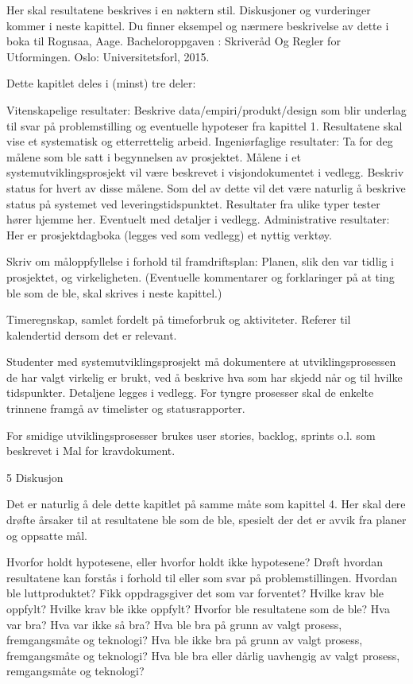 Her skal resultatene beskrives i en nøktern stil. Diskusjoner og vurderinger kommer i neste kapittel. Du finner eksempel og nærmere beskrivelse av dette i boka til Rognsaa, Aage. Bacheloroppgaven : Skriveråd Og Regler for Utformingen. Oslo: Universitetsforl, 2015.

Dette kapitlet deles i (minst) tre deler:

Vitenskapelige resultater: Beskrive data/empiri/produkt/design som blir underlag til svar på problemstilling og eventuelle hypoteser fra kapittel 1. Resultatene skal vise et systematisk og etterrettelig arbeid. 
Ingeniørfaglige resultater: Ta for deg målene som ble satt i begynnelsen av prosjektet. Målene i et systemutviklingsprosjekt vil være beskrevet i visjondokumentet i vedlegg. Beskriv status for hvert av disse målene. Som del av dette vil det være naturlig å beskrive status på systemet ved leveringstidspunktet.
Resultater fra ulike typer tester hører hjemme her. Eventuelt med detaljer i vedlegg.
Administrative resultater: Her er prosjektdagboka (legges ved som vedlegg) et nyttig verktøy.

Skriv om måloppfyllelse i forhold til framdriftsplan: Planen, slik den var tidlig i prosjektet, og virkeligheten. (Eventuelle kommentarer og forklaringer på at ting ble som de ble, skal skrives i neste kapittel.)

Timeregnskap, samlet fordelt på timeforbruk og aktiviteter. Referer til kalendertid dersom det er relevant.

Studenter med systemutviklingsprosjekt må dokumentere at utviklingsprosessen de har valgt virkelig er brukt, ved å beskrive hva som har skjedd når og til hvilke tidspunkter. Detaljene legges i vedlegg. For tyngre prosesser skal de enkelte trinnene framgå av timelister og statusrapporter.

For smidige utviklingsprosesser brukes user stories, backlog, sprints o.l. som beskrevet i Mal for kravdokument.

5 Diskusjon

Det er naturlig å dele dette kapitlet på samme måte som kapittel 4. Her skal dere drøfte årsaker til at resultatene ble som de ble, spesielt der det er avvik fra planer og oppsatte mål.

Hvorfor holdt hypotesene, eller hvorfor holdt ikke hypotesene? Drøft hvordan resultatene kan forstås i forhold til eller som svar på problemstillingen. Hvordan ble luttproduktet? Fikk oppdragsgiver det som var forventet? Hvilke krav ble oppfylt? Hvilke krav ble ikke oppfylt? Hvorfor ble resultatene som de ble? Hva var bra? Hva var ikke så bra? Hva ble bra på grunn av valgt prosess, fremgangsmåte og teknologi? Hva ble ikke bra på grunn av valgt prosess, fremgangsmåte og teknologi? Hva ble bra eller dårlig uavhengig av valgt prosess, remgangsmåte og teknologi?

